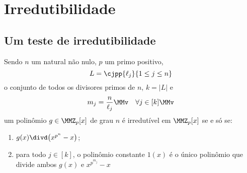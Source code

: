 
\chapter{Irredutibilidade}

\section{Um teste de irredutibilidade}

\begin{Teo}\label{maint}
  Sendo $n$ um natural não nulo, $p$ um primo positivo,
  \begin{equation*}
    L=\cjpp{\ell_j}{1\leq j\leq n}
  \end{equation*}
  o
  conjunto de todos os divisores primos de $n$, $k=|L|$ e
  \begin{equation*}
    m_j=\frac{n}{\ell_j}\MMv\quad\forall j\in[k]\MMv
  \end{equation*}
  um polinômio $g\in\MMZ_p[x]$ de grau
  $n$ é irredutível em $\MMZ_p[x]$ se e só se:
  \begin{enumerate}
    \item\label{mainti} $g(x)\divd \bigl(x^{p^n} -x\bigr)$;
    \item\label{maintii} para todo $j\in[k]$, o polinômio constante
      $1(x)$
    é o único polinômio que divide ambos $g(x)$ e $x^{p^{m_j}}-x$
  \end{enumerate}
\end{Teo}


